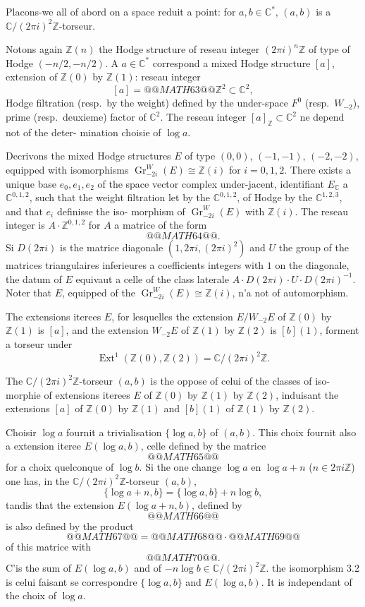 \documentclass[12pt,a4paper]{article}
\theoremstyle{plain}
\theoremstyle{definition}
\theoremstyle{remark}
\DeclareMathOperator{\Ext}{Ext}
\DeclareMathOperator{\Gr}{Gr}
\newcommand{\Z}{\mathbb{Z}}
\newcommand{\C}{\mathbb{C}}
\providecommand{\Ext}{\operatorname{Ext}}
\begin{document}
Placons-we all of abord on a space reduit a point: for $a, b \in \C^*$, $(a,b)$
is a $\C/(2\pi i)^2\Z$-torseur.

Notons again $\Z(n)$ the Hodge structure of reseau integer $(2\pi i)^n\Z$ of type of
Hodge $(-n/2, -n/2)$. A $a \in \C^*$ correspond a mixed Hodge structure $[a]$, extension
of $\Z(0)$ by $\Z(1)$: reseau integer
\[
[a] = @@MATH63@@ \Z^2 \subset \C^2,
\]
Hodge filtration (resp.~by the weight) defined by the under-space $F^0$ (resp.~$W_{-2}$), prime
(resp.~deuxieme) factor of $\C^2$. The reseau integer $[a]_\Z \subset \C^2$ ne depend not of the deter-
mination choisie of $\log a$.

Decrivons the mixed Hodge structures $E$ of type $(0,0)$, $(-1,-1)$, $(-2,-2)$,
equipped with isomorphisms $\Gr_{-2i}^W(E) \cong \Z(i)$ for $i = 0, 1, 2$. There exists a unique base
$e_0, e_1, e_2$ of the space vector complex under-jacent, identifiant $E_\C$ a $\C^{0,1,2}$, such that the
weight filtration let by the $\C^{0,1,2}$, of Hodge by the $\C^{1,2,3}$, and that $e_i$ definisse the iso-
morphism of $\Gr_{-2i}^W(E)$ with $\Z(i)$. The reseau integer is $A \cdot \Z^{0,1,2}$ for $A$ a matrice of the form
\[
@@MATH64@@.
\]
Si $D(2\pi i)$ is the matrice diagonale $(1, 2\pi i, (2\pi i)^2)$ and $U$ the group of the matrices triangulaires
inferieures a coefficients integers with $1$ on the diagonale, the datum of $E$ equivaut a celle
of the class laterale $A \cdot D(2\pi i) \cdot U \cdot D(2\pi i)^{-1}$. Noter that $E$, equipped of the $\Gr_{-2i}^W(E) \cong \Z(i)$, n'a
not of automorphism.

The extensions iterees $E$, for lesquelles the extension $E/W_{-2}E$ of $\Z(0)$ by $\Z(1)$
is $[a]$, and the extension $W_{-2}E$ of $\Z(1)$ by $\Z(2)$ is $[b](1)$, forment a torseur under
\[
\Ext^1(\Z(0), \Z(2)) = \C/(2\pi i)^2\Z.
\]

\begin{construction}
The $\C/(2\pi i)^2\Z$-torseur $(a,b)$ is the oppose of celui of the classes of iso-
morphie of extensions iterees $E$ of $\Z(0)$ by $\Z(1)$ by $\Z(2)$, induisant the extensions $[a]$ of $\Z(0)$
by $\Z(1)$ and $[b](1)$ of $\Z(1)$ by $\Z(2)$.
\end{construction}

Choisir $\log a$ fournit a trivialisation $\{\log a, b\}$ of $(a,b)$. This choix fournit also
a extension iteree $E(\log a, b)$, celle defined by the matrice
\[
@@MATH65@@
\]
for a choix quelconque of $\log b$. Si the one change $\log a$ en $\log a + n$ ($n \in 2\pi i\Z$) one has,
in the $\C/(2\pi i)^2\Z$-torseur $(a,b)$,
\[
\{\log a + n, b\} = \{\log a, b\} + n \log b,
\]
tandis that the extension $E(\log a + n, b)$, defined by
\[
@@MATH66@@
\]
is also defined by the product
\[
@@MATH67@@
=
@@MATH68@@
\cdot
@@MATH69@@
\]
of this matrice with
\[
@@MATH70@@.
\]
C'is the sum of $E(\log a, b)$ and of $-n \log b \in \C/(2\pi i)^2\Z$. the isomorphism 3.2 is
celui faisant se correspondre $\{\log a, b\}$ and $E(\log a, b)$. It is independant of the choix of
$\log a$.
\end{document}
